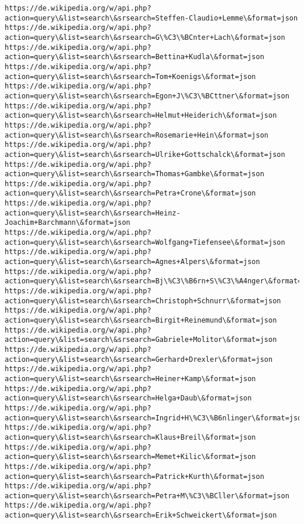\documentclass[11pt]{article}
\begin{document}
\begin{Verbatim}[commandchars=\\\{\}]
https://de.wikipedia.org/w/api.php?action=query\&list=search\&srsearch=Steffen-Claudio+Lemme\&format=json
https://de.wikipedia.org/w/api.php?action=query\&list=search\&srsearch=G\%C3\%BCnter+Lach\&format=json
https://de.wikipedia.org/w/api.php?action=query\&list=search\&srsearch=Bettina+Kudla\&format=json
https://de.wikipedia.org/w/api.php?action=query\&list=search\&srsearch=Tom+Koenigs\&format=json
https://de.wikipedia.org/w/api.php?action=query\&list=search\&srsearch=Egon+J\%C3\%BCttner\&format=json
https://de.wikipedia.org/w/api.php?action=query\&list=search\&srsearch=Helmut+Heiderich\&format=json
https://de.wikipedia.org/w/api.php?action=query\&list=search\&srsearch=Rosemarie+Hein\&format=json
https://de.wikipedia.org/w/api.php?action=query\&list=search\&srsearch=Ulrike+Gottschalck\&format=json
https://de.wikipedia.org/w/api.php?action=query\&list=search\&srsearch=Thomas+Gambke\&format=json
https://de.wikipedia.org/w/api.php?action=query\&list=search\&srsearch=Petra+Crone\&format=json
https://de.wikipedia.org/w/api.php?action=query\&list=search\&srsearch=Heinz-Joachim+Barchmann\&format=json
https://de.wikipedia.org/w/api.php?action=query\&list=search\&srsearch=Wolfgang+Tiefensee\&format=json
https://de.wikipedia.org/w/api.php?action=query\&list=search\&srsearch=Agnes+Alpers\&format=json
https://de.wikipedia.org/w/api.php?action=query\&list=search\&srsearch=Bj\%C3\%B6rn+S\%C3\%A4nger\&format=json
https://de.wikipedia.org/w/api.php?action=query\&list=search\&srsearch=Christoph+Schnurr\&format=json
https://de.wikipedia.org/w/api.php?action=query\&list=search\&srsearch=Birgit+Reinemund\&format=json
https://de.wikipedia.org/w/api.php?action=query\&list=search\&srsearch=Gabriele+Molitor\&format=json
https://de.wikipedia.org/w/api.php?action=query\&list=search\&srsearch=Gerhard+Drexler\&format=json
https://de.wikipedia.org/w/api.php?action=query\&list=search\&srsearch=Heiner+Kamp\&format=json
https://de.wikipedia.org/w/api.php?action=query\&list=search\&srsearch=Helga+Daub\&format=json
https://de.wikipedia.org/w/api.php?action=query\&list=search\&srsearch=Ingrid+H\%C3\%B6nlinger\&format=json
https://de.wikipedia.org/w/api.php?action=query\&list=search\&srsearch=Klaus+Breil\&format=json
https://de.wikipedia.org/w/api.php?action=query\&list=search\&srsearch=Memet+Kilic\&format=json
https://de.wikipedia.org/w/api.php?action=query\&list=search\&srsearch=Patrick+Kurth\&format=json
https://de.wikipedia.org/w/api.php?action=query\&list=search\&srsearch=Petra+M\%C3\%BCller\&format=json
https://de.wikipedia.org/w/api.php?action=query\&list=search\&srsearch=Erik+Schweickert\&format=json

\end{Verbatim}
\end{document}
